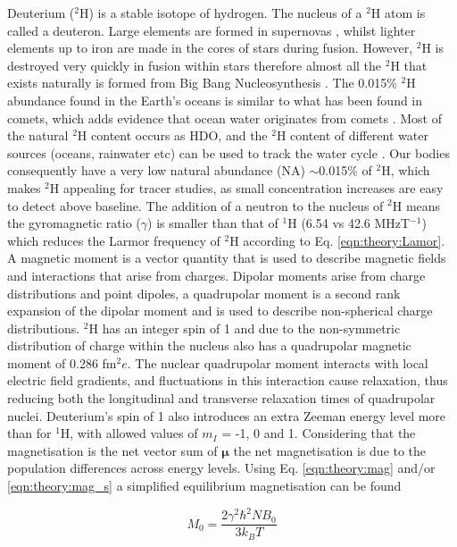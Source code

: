 Deuterium ($^2$H) is a stable isotope of hydrogen. The nucleus of a $^2$H atom is called a deuteron. Large elements are formed in supernovas \cite{Watson2019IdentificationStars}, whilst lighter elements up to iron are made in the cores of stars during fusion. However, $^2$H is destroyed very quickly in fusion within stars \cite{Patrignani2016ReviewPhysics} therefore almost all the $^2$H that exists naturally is formed from Big Bang Nucleosynthesis \cite{Joseph2023GeologicalEarth}. The 0.015\% $^2$H abundance found in the Earth's oceans is similar to what has been found in comets, which adds evidence that ocean water originates from comets \cite{Hersant2001APlanets}. Most of the natural $^2$H content occurs as \ac{HDO}, and the $^2$H content of different water sources (oceans, rainwater etc) can be used to track the water cycle \cite{Bowen2019IsotopesApplications}. Our bodies consequently have a very low natural abundance (NA) $\sim$0.015\% of $^2$H, which makes $^2$H appealing for tracer studies, as small concentration increases are easy to detect above baseline. The addition of a neutron to the nucleus of $^2$H means the gyromagnetic ratio ($\gamma$) is smaller than that of $^1$H (6.54 vs 42.6 MHzT$^{-1}$) which reduces the Larmor frequency of $^2$H according to Eq. \ref{eqn:theory:Lamor}. A magnetic moment is a vector quantity that is used to describe magnetic fields and interactions that arise from charges. Dipolar moments arise from charge distributions and point dipoles, a quadrupolar moment is a second rank expansion of the dipolar moment and is used to describe non-spherical charge distributions. $^2$H has an integer spin of 1 and due to the non-symmetric distribution of charge within the nucleus also has a quadrupolar magnetic moment of 0.286 fm$^2e$. The nuclear quadrupolar moment interacts with local electric field gradients, and fluctuations in this interaction cause relaxation, thus reducing both the longitudinal and transverse relaxation times of quadrupolar nuclei. Deuterium's spin of 1 also introduces an extra Zeeman energy level more than for $^1$H, with allowed values of $m_I$ = -1, 0 and 1. Considering that the magnetisation is the net vector sum of $\mathbf{\mu}$ the net magnetisation is due to the population differences across energy levels. Using Eq. \ref{eqn:theory:mag} and/or \ref{eqn:theory:mag_s} a simplified equilibrium magnetisation can be found

\begin{equation}
    M_0 = \frac{2\gamma^2 \hbar^2 N B_0}{3k_BT}
    \label{eqn:theory:mag_2H}
\end{equation}

